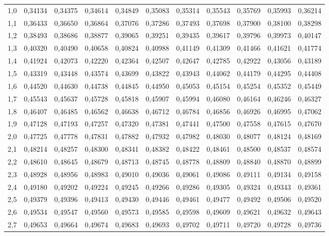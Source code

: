 \documentclass[a4paper]{article}
\begin{document}
\begin{center}
{\begin{tabular}{rrrrrrrrrrr}
  1,0 & 0,34134 & 0,34375 & 0,34614 & 0,34849 & 0,35083 & 0,35314 & 0,35543 & 0,35769 & 0,35993 & 0,36214 \\ 
  1,1 & 0,36433 & 0,36650 & 0,36864 & 0,37076 & 0,37286 & 0,37493 & 0,37698 & 0,37900 & 0,38100 & 0,38298 \\ 
  1,2 & 0,38493 & 0,38686 & 0,38877 & 0,39065 & 0,39251 & 0,39435 & 0,39617 & 0,39796 & 0,39973 & 0,40147 \\ 
  1,3 & 0,40320 & 0,40490 & 0,40658 & 0,40824 & 0,40988 & 0,41149 & 0,41309 & 0,41466 & 0,41621 & 0,41774 \\ 
  1,4 & 0,41924 & 0,42073 & 0,42220 & 0,42364 & 0,42507 & 0,42647 & 0,42785 & 0,42922 & 0,43056 & 0,43189 \\ 
  1,5 & 0,43319 & 0,43448 & 0,43574 & 0,43699 & 0,43822 & 0,43943 & 0,44062 & 0,44179 & 0,44295 & 0,44408 \\ 
  1,6 & 0,44520 & 0,44630 & 0,44738 & 0,44845 & 0,44950 & 0,45053 & 0,45154 & 0,45254 & 0,45352 & 0,45449 \\ 
  1,7 & 0,45543 & 0,45637 & 0,45728 & 0,45818 & 0,45907 & 0,45994 & 0,46080 & 0,46164 & 0,46246 & 0,46327 \\ 
  1,8 & 0,46407 & 0,46485 & 0,46562 & 0,46638 & 0,46712 & 0,46784 & 0,46856 & 0,46926 & 0,46995 & 0,47062 \\ 
  1,9 & 0,47128 & 0,47193 & 0,47257 & 0,47320 & 0,47381 & 0,47441 & 0,47500 & 0,47558 & 0,47615 & 0,47670 \\ 
  2,0 & 0,47725 & 0,47778 & 0,47831 & 0,47882 & 0,47932 & 0,47982 & 0,48030 & 0,48077 & 0,48124 & 0,48169 \\ 
  2,1 & 0,48214 & 0,48257 & 0,48300 & 0,48341 & 0,48382 & 0,48422 & 0,48461 & 0,48500 & 0,48537 & 0,48574 \\ 
  2,2 & 0,48610 & 0,48645 & 0,48679 & 0,48713 & 0,48745 & 0,48778 & 0,48809 & 0,48840 & 0,48870 & 0,48899 \\ 
  2,3 & 0,48928 & 0,48956 & 0,48983 & 0,49010 & 0,49036 & 0,49061 & 0,49086 & 0,49111 & 0,49134 & 0,49158 \\ 
  2,4 & 0,49180 & 0,49202 & 0,49224 & 0,49245 & 0,49266 & 0,49286 & 0,49305 & 0,49324 & 0,49343 & 0,49361 \\ 
  2,5 & 0,49379 & 0,49396 & 0,49413 & 0,49430 & 0,49446 & 0,49461 & 0,49477 & 0,49492 & 0,49506 & 0,49520 \\ 
  2,6 & 0,49534 & 0,49547 & 0,49560 & 0,49573 & 0,49585 & 0,49598 & 0,49609 & 0,49621 & 0,49632 & 0,49643 \\ 
  2,7 & 0,49653 & 0,49664 & 0,49674 & 0,49683 & 0,49693 & 0,49702 & 0,49711 & 0,49720 & 0,49728 & 0,49736 \\ 

\end{tabular}}
\end{center}
\end{document}
